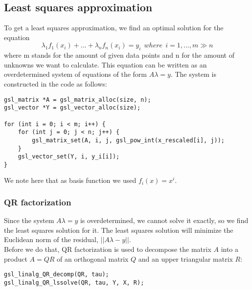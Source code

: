 \documentclass[11pt, a4paper, titlepage, openright]{article}
\begin{document}
\subsection{Least squares approximation}
To get a least squares approximation, we find an optimal solution for the equation
    \[ \lambda_1 f_1(x_i) + ... +  \lambda_n f_n(x_i) = y_i \ \ where \ \ i = 1,...,m \gg n \]
where m stands for the amount of given data points and n for the amount of unknowns we want to calculate.
This equation can be written as an overdetermined system of equations of the form \(A\lambda = y\).
The system is constructed in the code as follows:
\begin{lstlisting}
gsl_matrix *A = gsl_matrix_alloc(size, n);
gsl_vector *Y = gsl_vector_alloc(size);

for (int i = 0; i < m; i++) {
    for (int j = 0; j < n; j++) {
        gsl_matrix_set(A, i, j, gsl_pow_int(x_rescaled[i], j));
    }
    gsl_vector_set(Y, i, y_i[i]);
}
\end{lstlisting}
We note here that as basis function we used \( f_i(x) = x^i  \).

\subsubsection{QR factorization}
    Since the system \(A \lambda = y \) is overdetermined, we cannot solve it exactly, so we find the least squares solution for it.
    The least squares solution will minimize the Euclidean norm of the residual, \(||A\lambda - y||\). \\
    Before we do that, QR factorization is used to decompose the matrix \( A \) into a product \( A = QR \)
    of an orthogonal matrix \(Q\) and an upper triangular matrix \(R\):
\begin{lstlisting}
gsl_linalg_QR_decomp(QR, tau);
gsl_linalg_QR_lssolve(QR, tau, Y, X, R);
\end{lstlisting}
\end{document}
